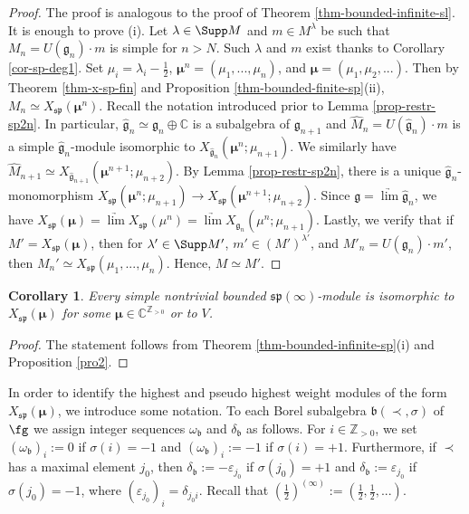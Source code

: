\documentclass[12pt]{amsart}
\newcommand{\C}{{\mathbb C}}
\newcommand{\Z}{{\mathbb Z}}
\def\gb{\mathfrak{b}}
\def\gg{\mathfrak{g}}
\def\Z{\mathbb{Z}}
\newtheorem{cor}[thm]{Corollary}
\begin{document}
\begin{proof} The proof is analogous to the proof of Theorem \ref{thm-bounded-infinite-sl}. It is enough to prove (i). Let $\lambda \in \Supp M$ and $m \in M^{\lambda}$ be such that $M_n = U(\gg_n) \cdot m$ is simple for $n>N$. Such $\lambda$ and $m$ exist thanks to Corollary \ref{cor-sp-deg1}. Set $\mu_i = \lambda_i - \frac{1}{2}$, $\boldsymbol{\mu}^n = (\mu_1,...,\mu_n)$, and $\boldsymbol{\mu}= (\mu_1,\mu_2,...)$. Then by Theorem \ref{thm-x-sp-fin} and Proposition \ref{thm-bounded-finite-sp}(ii), $M_n \simeq X_{\mathfrak{sp}} (\boldsymbol{\mu}^n)$. Recall the notation introduced prior to Lemma \ref{prop-restr-sp2n}. In particular, $\widehat{\gg}_n \simeq \gg_n \oplus \C$ is a subalgebra of $\gg_{n+1}$ and $\widehat{M}_n = U(\widehat{\gg}_n) \cdot m$ is a simple $\widehat{\gg}_n$-module isomorphic to 
$X_{\widehat{\gg}_n} (\boldsymbol{\mu}^n ; \mu_{n+1})$. We similarly have $\widehat{M}_{n+1} \simeq X_{\widehat{\gg}_{n+1}} (\boldsymbol{\mu}^{n+1}; \mu_{n+2})$. By Lemma \ref{prop-restr-sp2n}, there is a unique $\widehat{\gg}_n$-monomorphism $X_{\mathfrak{sp}} (\boldsymbol{\mu}^n; \mu_{n+1}) \to X_{\mathfrak{sp}} (\boldsymbol{\mu}^{n+1}; \mu_{n+2})$. Since $\gg =  \underrightarrow\lim \widehat{\gg}_n$, we have $X_{\mathfrak{sp}}(\boldsymbol{\mu})  =  \underrightarrow\lim X_{\mathfrak{sp}}(\mu^n) =   \underrightarrow\lim X_{\widehat{\gg}_n}(\mu^{n}; \mu_{n+1})$.  Lastly, we verify that if $M' = X_{\mathfrak{sp}}(\boldsymbol{\mu})$, then for $\lambda' \in \Supp M'$, $m' \in (M')^{\lambda'}$, and $M'_n = U(\gg_n)\cdot m'$, then $M_n' \simeq X_{\mathfrak{sp}} (\mu_1,...,\mu_n)$. Hence, $M \simeq M'$.\end{proof}


\begin{cor} Every simple nontrivial bounded $\mathfrak{sp} (\infty)$-module is isomorphic to $X_{\mathfrak{sp}} (\boldsymbol{\mu})$ for some $\boldsymbol{\mu} \in \C^{\Z_{>0}}$ or to $V$.
\end{cor}
\begin{proof}
The statement follows from Theorem \ref{thm-bounded-infinite-sp}(i) and Proposition \ref{pro2}.
\end{proof}



In order to identify the highest and pseudo highest weight modules of the form $X_{\mathfrak{sp}}(\boldsymbol{\mu})$, we introduce some notation.  To each Borel subalgebra $\gb  (\prec, \sigma)$ of $\fg$ we assign integer sequences $\omega_{\gb}$ and $\delta_{\gb}$ as follows. For $i \in {\mathbb Z}_{>0}$, we set $(\omega_{\gb})_i := 0$ if $\sigma(i) = -1$ and $(\omega_{\gb})_i := - 1$ if $\sigma(i) = +1$. Furthermore, if $\prec$ has a maximal element $j_0$, then $\delta_{\gb} := -\varepsilon_{j_0}$ if $\sigma(j_0) = +1$ and $\delta_{\gb} := \varepsilon_{j_0}$ if $\sigma(j_0) = -1$, where $(\varepsilon_{j_0})_i  = \delta_{j_0i}$. Recall that $\left(\frac{1}{2}\right)^{(\infty)} := \left(\frac{1}{2}, \frac{1}{2}, ...\right)$.
\end{document}
